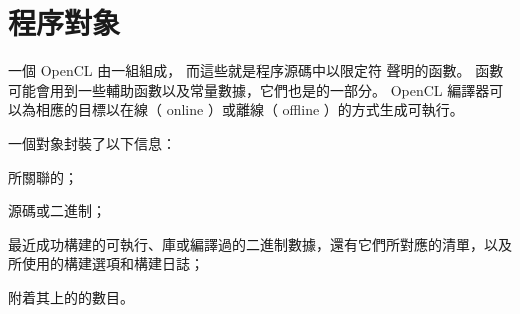\section{程序對象}

一個 OpenCL 由一組組成，
而這些就是程序源碼中以限定符  聲明的函數。
  函數可能會用到一些輔助函數以及常量數據，它們也是的一部分。
 OpenCL 編譯器可以為相應的目標以{\ftEmp 在線}（ {\ftEmp online} ）或{\ftEmp 離線}（ {\ftEmp offline} ）的方式生成可執行。

一個對象封裝了以下信息：
\startigBase
\item 所關聯的；
\item {}源碼或二進制；
\item 最近成功構建的可執行、庫或編譯過的二進制數據，還有它們所對應的清單，以及所使用的構建選項和構建日誌；
\item 附着其上的的數目。
\stopigBase




